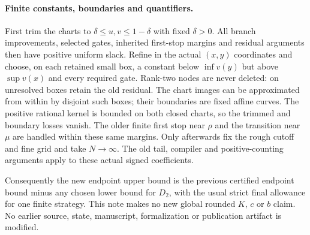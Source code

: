 \paragraph{Finite constants, boundaries and quantifiers.}
First trim the charts to $\delta\le u,v\le1-\delta$ with fixed
$\delta>0$. All branch improvements, selected gates, inherited
first-stop margins and residual arguments then have positive uniform
slack. Refine in the actual $(x,y)$ coordinates and choose, on each
retained small box, a constant below $\inf v(y)$ but above
$\sup v(x)$ and every required gate. Rank-two nodes are never deleted:
on unresolved boxes retain the old residual. The chart images can
be approximated from within by disjoint such boxes; their boundaries
are fixed affine curves. The positive rational kernel is bounded
on both closed charts, so the trimmed and boundary losses vanish.
The older finite first stop near $\rho$ and the transition near $\mu$
are handled within these same margins. Only afterwards fix the rough
cutoff and fine grid and take $N\to\infty$. The old tail, compiler and
positive-counting arguments apply to these actual signed coefficients.

Consequently the new endpoint upper bound is the previous certified
endpoint bound minus any chosen lower bound for $D_2$, with the usual
strict final allowance for one finite strategy. This note makes no
new global rounded $K$, $c$ or $b$ claim. No earlier source, state,
manuscript, formalization or publication artifact is modified.
